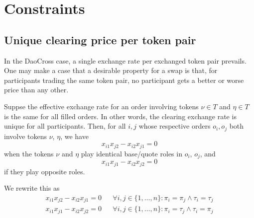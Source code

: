 \documentclass[11pt, reqno]{amsart}
\theoremstyle{definition}
\theoremstyle{remark}
\begin{document}
%
%

\section{Constraints}



\subsection{Unique clearing price per token pair}

In the DaoCross case, a single exchange rate per exchanged token pair
prevails. One may make a case that a desirable property for a swap is that,
for participants trading the same token pair, no participant gets a better or
worse price than any other.

Suppse the effective exchange rate for an order involving tokens $\nu \in T$
and $\eta \in T$ is the same for all filled orders. In other words, the clearing
exchange rate is unique for all participants.
Then, for all $i, j$ whose respective orders $o_i, o_j$ both involve tokens
$\nu$, $\eta$, we have
\[
    x_{i1} x_{j2} - x_{i2} x_{j1} = 0
\]
when the tokens $\nu$ and $\eta$ play identical base/quote roles in $o_i$,
$o_j$, and
\[
    x_{i1} x_{j1} - x_{i2} x_{j2} = 0
\]
if they play opposite roles.

We rewrite this as
\begin{align*}
    x_{i1} x_{j2} - x_{i2} x_{j1} = 0 & & \forall i, j \in \{1, \ldots, n\}: \pi_i = \pi_j \land \tau_i = \tau_j \\
    x_{i1} x_{j1} - x_{i2} x_{j2} = 0 & & \forall i, j \in \{1, \ldots, n\}: \pi_i = \tau_j \land \tau_i = \pi_j
\end{align*}
\end{document}
